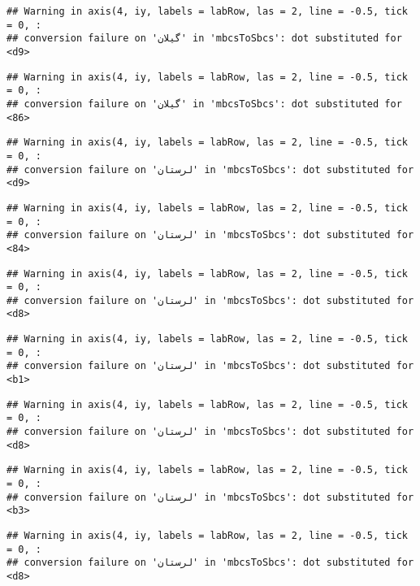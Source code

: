 \documentclass[
]{article}
\begin{document}
\begin{verbatim}
## Warning in axis(4, iy, labels = labRow, las = 2, line = -0.5, tick = 0, :
## conversion failure on 'گیلان' in 'mbcsToSbcs': dot substituted for <d9>
\end{verbatim}

\begin{verbatim}
## Warning in axis(4, iy, labels = labRow, las = 2, line = -0.5, tick = 0, :
## conversion failure on 'گیلان' in 'mbcsToSbcs': dot substituted for <86>
\end{verbatim}

\begin{verbatim}
## Warning in axis(4, iy, labels = labRow, las = 2, line = -0.5, tick = 0, :
## conversion failure on 'لرستان' in 'mbcsToSbcs': dot substituted for <d9>
\end{verbatim}

\begin{verbatim}
## Warning in axis(4, iy, labels = labRow, las = 2, line = -0.5, tick = 0, :
## conversion failure on 'لرستان' in 'mbcsToSbcs': dot substituted for <84>
\end{verbatim}

\begin{verbatim}
## Warning in axis(4, iy, labels = labRow, las = 2, line = -0.5, tick = 0, :
## conversion failure on 'لرستان' in 'mbcsToSbcs': dot substituted for <d8>
\end{verbatim}

\begin{verbatim}
## Warning in axis(4, iy, labels = labRow, las = 2, line = -0.5, tick = 0, :
## conversion failure on 'لرستان' in 'mbcsToSbcs': dot substituted for <b1>
\end{verbatim}

\begin{verbatim}
## Warning in axis(4, iy, labels = labRow, las = 2, line = -0.5, tick = 0, :
## conversion failure on 'لرستان' in 'mbcsToSbcs': dot substituted for <d8>
\end{verbatim}

\begin{verbatim}
## Warning in axis(4, iy, labels = labRow, las = 2, line = -0.5, tick = 0, :
## conversion failure on 'لرستان' in 'mbcsToSbcs': dot substituted for <b3>
\end{verbatim}

\begin{verbatim}
## Warning in axis(4, iy, labels = labRow, las = 2, line = -0.5, tick = 0, :
## conversion failure on 'لرستان' in 'mbcsToSbcs': dot substituted for <d8>
\end{verbatim}
\end{document}
